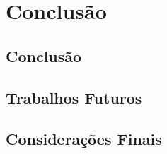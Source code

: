
\chapter{Conclusão}%
\label{chap:conclusao}


\section{Conclusão}

\section{Trabalhos Futuros}

\section{Considerações Finais}
